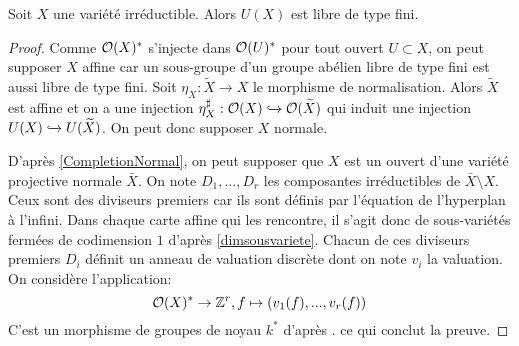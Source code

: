 \begin{prop}
Soit $X$ une variété irréductible. Alors $U(X)$ est libre de type fini.
\end{prop}
\begin{proof}
Comme $\mathcal{O}(X)^*$ s'injecte dans $\mathcal{O}(U)^*$ pour tout ouvert $U\subset X$, on peut supposer $X$ affine car un sous-groupe d'un groupe abélien libre de type fini est aussi libre de type fini. Soit $\eta_X:\widetilde{X}\rightarrow X$ le morphisme de normalisation. Alors $\widetilde{X}$ est affine et on a une injection $\eta_X^\sharp:\mathcal{O}(X)\xhookrightarrow{}\mathcal{O}(\widetilde{X})$ qui induit une injection $U(X)\xhookrightarrow{}U(\widetilde{X})$. On peut donc supposer $X$ normale.

D'après \ref{CompletionNormal}, on peut supposer que $X$ est un ouvert d'une variété projective normale $\bar{X}$. On note $D_1,...,D_r$ les composantes irréductibles de $\bar{X}\setminus X$. Ceux sont des diviseurs premiers car ils sont définis par l'équation de l'hyperplan à l'infini. Dans chaque carte affine qui les rencontre, il s'agit donc de sous-variétés fermées de codimension $1$ d'après \ref{dimsousvariete}. Chacun de ces diviseurs premiers $D_i$ définit un anneau de valuation discrète dont on note $v_i$ la valuation. On considère l'application:
$$\mathcal{O}(X)^*\rightarrow \mathbb{Z}^r, f\mapsto (v_1(f),...,v_r(f))$$
C'est un morphisme de groupes de noyau $k^*$ d'après \cite[I.3.4]{Hartshorne}. ce qui conclut la preuve.
\end{proof}

